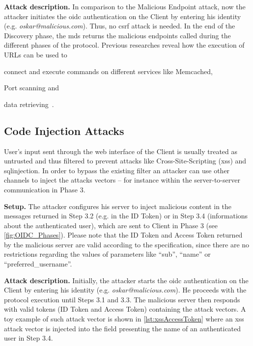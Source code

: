 \documentclass[conference,compsoc]{IEEEtran}
\renewcommand*{\paragraph}[1]{\vspace{2mm}\noindent\textbf{#1.}}
\begin{document}
\paragraph{Attack description}
In comparison to the Malicious Endpoint attack, now the attacker initiates the \gls{oidc} authentication on the Client by entering his identity (e.g. \emph{oskar@malicious.com}). Thus, no \gls{csrf} attack is needed.
In the end of the Discovery phase, the \gls{mds} returns the malicious endpoints called during the different phases of the protocol.
Previous researches reveal how the execution of URLs can be used to 
\begin{inparaenum}
	\item connect and execute commands on different services like Memcached, 
	\item Port scanning and 
	\item data retrieving~\cite{ssrf_blackhat2012,ssrfbible}.
\end{inparaenum}



\subsection{Code Injection Attacks}
\label{sec:injectionattacks}
User's input sent through the web interface of the Client is usually treated as untrusted and thus filtered to prevent attacks like Cross-Site-Scripting (\gls{xss}) and \gls{sqlinjection}.
In order to bypass the existing filter an attacker can use other channels to inject the attacks vectors -- for instance within the server-to-server communication in Phase 3.

\paragraph{Setup}
The attacker configures his server to inject malicious content in the messages returned in Step 3.2 (e.g. in the ID Token) or in Step 3.4 (informations about the authenticated user), which are sent to Client in Phase 3 (see \autoref{fig:OIDC_Phases}). Please note that the ID Token and Access Token returned by the malicious server are valid according to the specification, since there are no restrictions regarding the values of parameters like ``sub'', ``name'' or ``preferred\_username''.

\paragraph{Attack description}
Initially, the attacker starts the \gls{oidc} authentication on the Client by entering his identity (e.g. \emph{oskar@malicious.com}). He proceeds with the protocol execution until Steps 3.1 and 3.3.
The malicious server then responds with valid tokens (ID Token and Access Token) containing the attack vectors.
A toy example of such attack vector is shown in \autoref{lst:xssAccessToken} where an \gls{xss} attack vector is injected into the field presenting the name of an authenticated user in Step 3.4.
\end{document}
